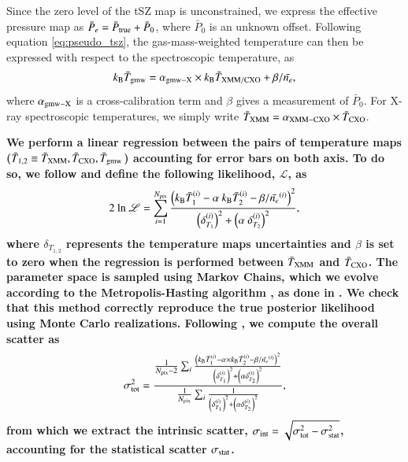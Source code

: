 \documentclass[twocolumn,traditabstract]{aa}
\begin{document}
Since the zero level of the tSZ map is unconstrained, we express the effective pressure map as $\bar{P}_e = \bar{P}_{\rm true} + \bar{P}_0$, where $\bar{P}_0$ is an unknown offset. Following equation \ref{eq:pseudo_tsz}, the gas-mass-weighted temperature can then be expressed with respect to the spectroscopic temperature, as
\begin{equation}
k_{\rm B} \bar{T}_{\rm gmw} = \alpha_{\rm gmw-X} \times k_{\rm B} \bar{T}_{\rm XMM/CXO} + {\beta}/{\bar{n_e}},
\label{eq:TSZ_TX_regression}
\end{equation}
where $\alpha_{\rm gmw-X}$ is a cross-calibration term and $\beta$ gives a measurement of $\bar{P}_0$. For X-ray spectroscopic temperatures, we simply write $\bar{T}_{\rm XMM} = \alpha_{\rm XMM-CXO} \times \bar{T}_{\rm CXO}$. 

{\bf We perform a linear regression between the pairs of temperature maps ($\bar{T}_{1,2} \equiv \bar{T}_{\rm XMM}, \bar{T}_{\rm CXO}, \bar{T}_{\rm gmw}$) accounting for error bars on both axis. To do so, we follow \cite{Orear1982} and define the following likelihood, $\mathscr{L}$, as
\begin{equation}
2 \ {\rm ln} \ \mathscr{L} = \sum_{i=1}^{N_{\rm pix}} \frac{\left(k_{\rm B} \bar{T}^{(i)}_{1} - \alpha \ k_{\rm B} \bar{T}^{(i)}_{2} - {\beta}/{\bar{n_e}^{(i)}}\right)^2}{\left(\delta^{(i)}_{T_{1}}\right)^2 + \left(\alpha \ \delta^{(i)}_{T_{2}}\right)^2},
\label{eq:chi2_def}
\end{equation}
where $\delta_{T_{1,2}}$ represents the temperature maps uncertainties and $\beta$ is set to zero when the regression is performed between $\bar{T}_{\rm XMM}$ and $\bar{T}_{\rm CXO}$. The parameter space is sampled using Markov Chains, which we evolve according to the Metropolis-Hasting algorithm \citep{Chib1995}, as done in \cite{Adam2015}. We check that this method correctly reproduce the true posterior likelihood using Monte Carlo realizations. Following \citep{Pratt2009}, we compute the overall scatter as
\begin{equation}
\sigma_{\rm tot}^2 = \frac{\frac{1}{N_{\rm pix} - 2} \sum_i \frac{\left(k_{\rm B} \bar{T}^{(i)}_{1} - \alpha \times k_{\rm B} \bar{T}^{(i)}_{2} - {\beta}/{\bar{n_e}^{(i)}}\right)^2}{\left(\delta^{(i)}_{T_{1}}\right)^2 + \left(\alpha \delta^{(i)}_{T_{2}}\right)^2}}{\frac{1}{N_{\rm pix}} \sum_i \frac{1}{\left(\delta^{(i)}_{T_{1}}\right)^2 + \left(\alpha \delta^{(i)}_{T_{2}}\right)^2}},
\label{eq:scatter_def}
\end{equation}
from which we extract the intrinsic scatter, $\sigma_{\rm int} = \sqrt{\sigma_{\rm tot}^2 - \sigma_{\rm stat}^2}$, accounting for the statistical scatter $\sigma_{\rm stat}$.}
\end{document}

